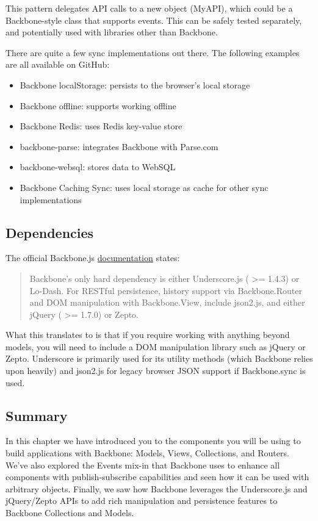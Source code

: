 \documentclass[9pt]{book}
\begin{document}
This pattern delegates API calls to a new object (MyAPI), which could be
a Backbone-style class that supports events. This can be safely tested
separately, and potentially used with libraries other than Backbone.

There are quite a few sync implementations out there. The following
examples are all available on GitHub:

\begin{itemize}
\itemsep1pt\parskip0pt
\item
  Backbone localStorage: persists to the browser's local storage
\item
  Backbone offline: supports working offline
\item
  Backbone Redis: uses Redis key-value store
\item
  backbone-parse: integrates Backbone with Parse.com
\item
  backbone-websql: stores data to WebSQL
\item
  Backbone Caching Sync: uses local storage as cache for other sync
  implementations
\end{itemize}

\subsection{Dependencies}\label{dependencies}

The official Backbone.js \href{http://backbonejs.org/}{documentation}
states:

\begin{quote}
Backbone's only hard dependency is either Underscore.js (
\textgreater{}= 1.4.3) or Lo-Dash. For RESTful persistence, history
support via Backbone.Router and DOM manipulation with Backbone.View,
include json2.js, and either jQuery ( \textgreater{}= 1.7.0) or Zepto.
\end{quote}

What this translates to is that if you require working with anything
beyond models, you will need to include a DOM manipulation library such
as jQuery or Zepto. Underscore is primarily used for its utility methods
(which Backbone relies upon heavily) and json2.js for legacy browser
JSON support if Backbone.sync is used.

\subsection{Summary}\label{summary-1}

In this chapter we have introduced you to the components you will be
using to build applications with Backbone: Models, Views, Collections,
and Routers. We've also explored the Events mix-in that Backbone uses to
enhance all components with publish-subscribe capabilities and seen how
it can be used with arbitrary objects. Finally, we saw how Backbone
leverages the Underscore.js and jQuery/Zepto APIs to add rich
manipulation and persistence features to Backbone Collections and
Models.
\end{document}
